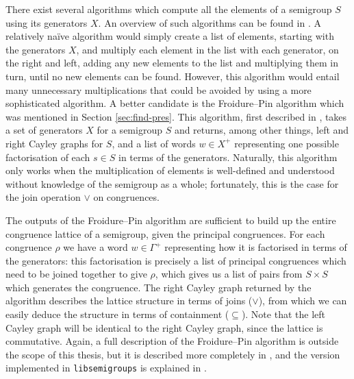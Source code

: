 There exist several algorithms which compute all the elements of a semigroup $S$
using its generators $X$.  An overview of such algorithms can be found in
\cite[\S1]{computing_finite_semigroups}.  A relatively na\"ive algorithm would
simply create a list of elements, starting with the generators $X$, and multiply
each element in the list with each generator, on the right and left, adding any
new elements to the list and multiplying them in turn, until no new elements can
be found.  However, this algorithm would entail many unnecessary multiplications
that could be avoided by using a more sophisticated algorithm.  A better
candidate is the Froidure--Pin algorithm which was mentioned in Section
\ref{sec:find-pres}.  This algorithm, first described in \cite{froidure_pin},
takes a set of generators $X$ for a semigroup $S$ and returns, among other
things, left and right Cayley graphs for $S$, and a list of words $w \in X^+$
representing one possible factorisation of each $s \in S$ in terms of the
generators.  Naturally, this algorithm only works when the multiplication of
elements is well-defined and understood without knowledge of the semigroup as a
whole; fortunately, this is the case for the join operation $\vee$ on
congruences.

The outputs of the Froidure--Pin algorithm are sufficient to build up the entire
congruence lattice of a semigroup, given the principal congruences.  For each
congruence $\rho$ we have a word $w \in \Gamma^+$ representing how it is
factorised in terms of the generators: this factorisation is precisely a list of
principal congruences which need to be joined together to give $\rho$, which
gives us a list of pairs from $S \times S$ which generates the congruence.  The
right Cayley graph returned by the algorithm describes the lattice structure in
terms of joins ($\vee$), from which we can easily deduce the structure in terms
of containment ($\subseteq$).  Note that the left Cayley graph will be identical
to the right Cayley graph, since the lattice is commutative.  Again, a full
description of the Froidure--Pin algorithm is outside the scope of this thesis,
but it is described more completely in \cite{froidure_pin}, and the version
implemented in \texttt{libsemigroups} is explained in
\cite{froidure_pin_jonusas}.


